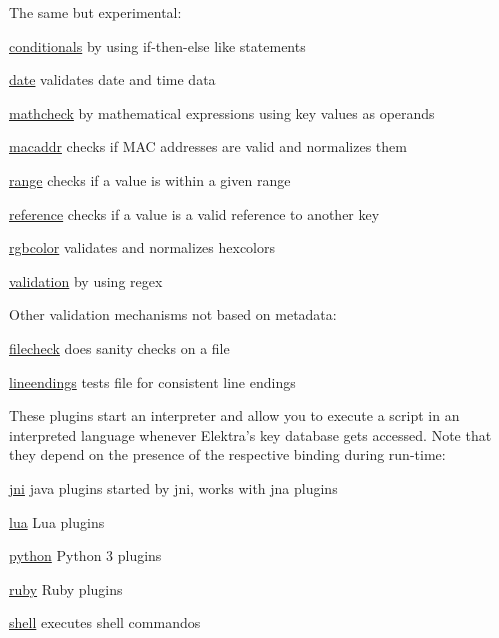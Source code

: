 The same but experimental\+:


\begin{DoxyItemize}
\item \hyperlink{autotoc_md84_src_plugins_conditionals_README_md}{conditionals} by using if-\/then-\/else like statements
\item \hyperlink{autotoc_md149_src_plugins_date_README_md}{date} validates date and time data
\item \hyperlink{autotoc_md374_src_plugins_mathcheck_README_md}{mathcheck} by mathematical expressions using key values as operands
\item \hyperlink{autotoc_md370_src_plugins_macaddr_README_md}{macaddr} checks if M\+AC addresses are valid and normalizes them
\item \hyperlink{autotoc_md540_src_plugins_range_README_md}{range} checks if a value is within a given range
\item \hyperlink{autotoc_md564_src_plugins_reference_README_md}{reference} checks if a value is a valid reference to another key
\item \hyperlink{autotoc_md596_src_plugins_rgbcolor_README_md}{rgbcolor} validates and normalizes hexcolors
\item \hyperlink{autotoc_md767_src_plugins_validation_README_md}{validation} by using regex
\end{DoxyItemize}

Other validation mechanisms not based on metadata\+:


\begin{DoxyItemize}
\item \hyperlink{autotoc_md229_src_plugins_filecheck_README_md}{filecheck} does sanity checks on a file
\item \hyperlink{autotoc_md356_src_plugins_lineendings_README_md}{lineendings} tests file for consistent line endings
\end{DoxyItemize}

These plugins start an interpreter and allow you to execute a script in an interpreted language whenever Elektra’s key database gets accessed. Note that they depend on the presence of the respective binding during run-\/time\+:


\begin{DoxyItemize}
\item \hyperlink{autotoc_md309_src_plugins_jni_README_md}{jni} java plugins started by jni, works with jna plugins
\item \hyperlink{autotoc_md364_src_plugins_lua_README_md}{lua} Lua plugins
\item \hyperlink{autotoc_md510_src_plugins_python_README_md}{python} Python 3 plugins
\item \hyperlink{autotoc_md599_src_plugins_ruby_README_md}{ruby} Ruby plugins
\item \hyperlink{autotoc_md604_src_plugins_shell_README_md}{shell} executes shell commandos
\end{DoxyItemize}


